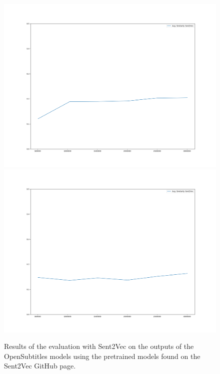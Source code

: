 \begin{figure}[H]
	\includegraphics[width=\linewidth]{img/plots/opensubtitles_not_reversed/s2v_wiki_cosine_similarity.png}
	\centering
	\small
	\endminipage\hfill
	\includegraphics[width=\linewidth]{img/plots/opensubtitles_not_reversed/s2v_twitter_cosine_similarity.png}
	\centering
	\small
	\endminipage\hfill
	\caption{Results of the evaluation with Sent2Vec on the outputs of the OpenSubtitles models using the pretrained models found on the Sent2Vec GitHub page.}
	\label{results:sent2vec:opensubtitles:results}
\end{figure}

